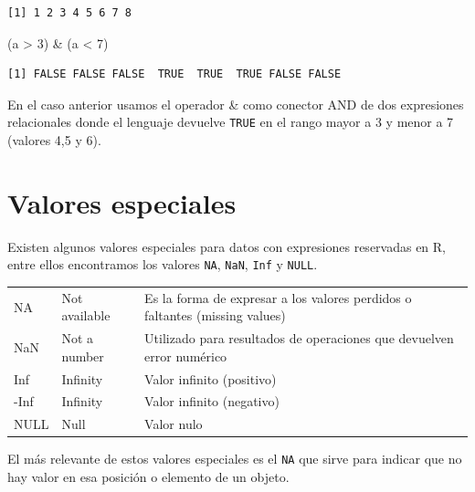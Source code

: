 \documentclass[
  spanish,
  letterpaper,
  DIV=11,
  numbers=noendperiod]{scrreprt}
\newenvironment{Shaded}{\begin{snugshade}}{\end{snugshade}}
\newcommand{\DecValTok}[1]{\textcolor[rgb]{0.68,0.00,0.00}{#1}}
\newcommand{\NormalTok}[1]{\textcolor[rgb]{0.00,0.23,0.31}{#1}}
\newcommand{\SpecialCharTok}[1]{\textcolor[rgb]{0.37,0.37,0.37}{#1}}
\begin{document}
\begin{verbatim}
[1] 1 2 3 4 5 6 7 8
\end{verbatim}

\begin{Shaded}
\begin{Highlighting}[]
\NormalTok{(a }\SpecialCharTok{\textgreater{}} \DecValTok{3}\NormalTok{) }\SpecialCharTok{\&}\NormalTok{ (a }\SpecialCharTok{\textless{}} \DecValTok{7}\NormalTok{)}
\end{Highlighting}
\end{Shaded}

\begin{verbatim}
[1] FALSE FALSE FALSE  TRUE  TRUE  TRUE FALSE FALSE
\end{verbatim}

En el caso anterior usamos el operador \& como conector AND de dos
expresiones relacionales donde el lenguaje devuelve \texttt{TRUE} en el
rango mayor a 3 y menor a 7 (valores 4,5 y 6).

\section{Valores especiales}\label{valores-especiales}

Existen algunos valores especiales para datos con expresiones reservadas
en R, entre ellos encontramos los valores \texttt{NA}, \texttt{NaN},
\texttt{Inf} y \texttt{NULL}.

\begin{table}
\centering
\begin{tabular}[t]{l|l|l}
\hline
\cellcolor[HTML]{2f2e4e}{\textcolor{white}{Operador}} & \cellcolor[HTML]{2f2e4e}{\textcolor{white}{Significado}} & \cellcolor[HTML]{2f2e4e}{\textcolor{white}{Descripción}}\\
\hline
NA & Not available & Es la forma de expresar a los valores perdidos o faltantes (missing values)\\
\hline
NaN & Not a number & Utilizado para resultados de operaciones que devuelven error numérico\\
\hline
Inf & Infinity & Valor infinito (positivo)\\
\hline
-Inf & Infinity & Valor infinito (negativo)\\
\hline
NULL & Null & Valor nulo\\
\hline
\end{tabular}
\end{table}

El más relevante de estos valores especiales es el \texttt{NA} que sirve
para indicar que no hay valor en esa posición o elemento de un objeto.
\end{document}

